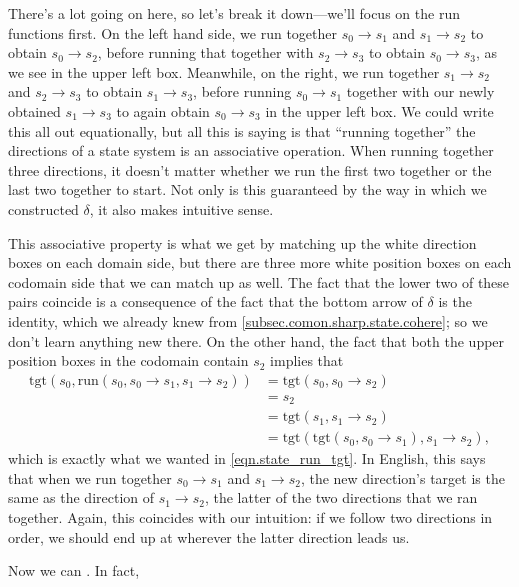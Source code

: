 \documentclass[Book-Poly]{subfiles}
\begin{document}
There's a lot going on here, so let's break it down---we'll focus on the run functions first.
On the left hand side, we run together $s_0\to s_1$ and $s_1\to s_2$ to obtain $s_0\to s_2$, before running that together with $s_2\to s_3$ to obtain $s_0\to s_3$, as we see in the upper left box.
Meanwhile, on the right, we run together $s_1\to s_2$ and $s_2\to s_3$ to obtain $s_1\to s_3$, before running $s_0\to s_1$ together with our newly obtained $s_1\to s_3$ to again obtain $s_0\to s_3$ in the upper left box.
We could write this all out equationally, but all this is saying is that ``running together'' the directions of a state system is an associative operation.
When running together three directions, it doesn't matter whether we run the first two together or the last two together to start.
Not only is this guaranteed by the way in which we constructed $\delta$, it also makes intuitive sense.

This associative property is what we get by matching up the white direction boxes on each domain side, but there are three more white position boxes on each codomain side that we can match up as well.
The fact that the lower two of these pairs coincide is a consequence of the fact that the bottom arrow of $\delta$ is the identity, which we already knew from \cref{subsec.comon.sharp.state.cohere}; so we don't learn anything new there.
On the other hand, the fact that both the upper position boxes in the codomain contain $s_2$ implies that
\begin{align*}
    \text{tgt}(s_0,\text{run}(s_0,s_0\to s_1,s_1\to s_2))&=\text{tgt}(s_0,s_0\to s_2)\\
    &=s_2\\
    &=\text{tgt}(s_1,s_1\to s_2)\\
    &=\text{tgt}(\text{tgt}(s_0,s_0\to s_1),s_1\to s_2),
\end{align*}
which is exactly what we wanted in \eqref{eqn.state_run_tgt}.
In English, this says that when we run together $s_0\to s_1$ and $s_1\to s_2$, the new direction's target is the same as the direction of $s_1\to s_2$, the latter of the two directions that we ran together.
Again, this coincides with our intuition: if we follow two directions in order, we should end up at wherever the latter direction leads us.

Now we can .
In fact, 
\end{document}
